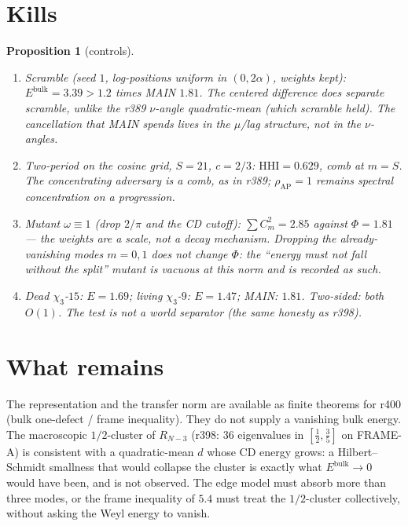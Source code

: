 \documentclass[11pt]{article}
\newtheorem{prop}{Proposition}
\theoremstyle{remark}
\begin{document}
\section{Kills}\label{sec:kills}

\begin{prop}[controls]\label{prop:kills}
\begin{enumerate}
\item Scramble (seed $1$, log-positions uniform in
$(0,2\alpha)$, weights kept): $E^{\mathrm{bulk}}=3.39>1.2$
times MAIN $1.81$.
The centered difference \emph{does} separate scramble,
unlike the r389 $\nu$-angle quadratic-mean (which scramble
held).
The cancellation that MAIN spends lives in the $\mu$/lag
structure, not in the $\nu$-angles.
\item Two-period on the cosine grid, $S=21$, $c=2/3$:
$\mathrm{HHI}=0.629$, comb at $m=S$.
The concentrating adversary is a comb, as in r389;
$\rho_{\mathrm{AP}}=1$ remains spectral concentration on a
progression.
\item Mutant $\omega\equiv 1$ (drop $2/\pi$ and the CD cutoff):
$\sum C_m^2=2.85$ against $\Phi=1.81$ --- the weights are a
scale, not a decay mechanism.
Dropping the already-vanishing modes $m=0,1$ does not change
$\Phi$: the ``energy must not fall without the split'' mutant
is vacuous at this norm and is recorded as such.
\item Dead $\chi_3$-$15$: $E=1.69$; living $\chi_3$-$9$:
$E=1.47$; MAIN: $1.81$.
Two-sided: both $O(1)$.  The test is not a world separator
(the same honesty as r398).
\end{enumerate}
\end{prop}

\section{What remains}\label{sec:rest}

The representation and the transfer norm are available as
finite theorems for r400 (bulk one-defect / frame inequality).
They do not supply a vanishing bulk energy.
The macroscopic $1/2$-cluster of $R_{N-3}$ (r398: $36$
eigenvalues in $[\tfrac12,\tfrac35]$ on FRAME-A) is consistent
with a quadratic-mean $d$ whose CD energy grows: a
Hilbert--Schmidt smallness that would collapse the cluster is
exactly what $E^{\mathrm{bulk}}\to0$ would have been, and is
not observed.
The edge model must absorb more than three modes, or the
frame inequality of $5.4$ must treat the $1/2$-cluster
collectively, without asking the Weyl energy to vanish.
\end{document}
